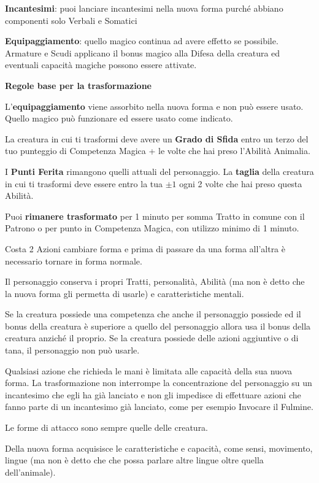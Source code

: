 \begin{multicols}{2}
\textbf{Incantesimi}: puoi lanciare incantesimi nella nuova forma purché abbiano componenti solo Verbali e Somatici

\textbf{Equipaggiamento}: quello magico continua ad avere effetto se possibile. Armature e Scudi applicano il bonus magico alla Difesa della creatura ed eventuali capacità magiche possono essere attivate.

\medskip

\textbf{Regole base per la trasformazione}

\medskip

L'\textbf{equipaggiamento} viene assorbito nella nuova forma e non può essere usato. Quello magico può funzionare ed essere usato come indicato.

La creatura in cui ti trasformi deve avere un \textbf{Grado di Sfida} entro un terzo del tuo punteggio di Competenza Magica + le volte che hai preso l'Abilità Animalia.

I \textbf{Punti Ferita} rimangono quelli attuali del personaggio. La \textbf{taglia} della creatura in cui ti trasformi deve essere entro la tua $\pm 1$ ogni 2 volte che hai preso questa Abilità.

Puoi \textbf{rimanere trasformato} per 1 minuto per somma Tratto in comune con il Patrono  o per punto in Competenza Magica, con utilizzo minimo di 1 minuto.

Costa 2 Azioni cambiare forma e prima di passare da una forma all'altra è necessario tornare in forma normale.

Il personaggio conserva i propri Tratti, personalità, Abilità (ma non è detto che la nuova forma gli permetta di usarle) e caratteristiche mentali.

Se la creatura possiede una competenza che anche il personaggio possiede ed il bonus della creatura è superiore a quello del personaggio allora usa il bonus della creatura anziché il proprio. Se la creatura possiede delle azioni aggiuntive o di tana, il personaggio non può usarle.

Qualsiasi azione che richieda le mani è limitata alle capacità della sua nuova forma. La trasformazione non interrompe la concentrazione del personaggio su un incantesimo che egli ha già lanciato e non gli impedisce di effettuare azioni che fanno parte di un incantesimo già lanciato, come per esempio Invocare il Fulmine.

Le forme di attacco sono sempre quelle delle creatura.

Della nuova forma acquisisce le caratteristiche e capacità, come sensi, movimento, lingue (ma non è detto che che possa parlare altre lingue oltre quella dell'animale).


\end{multicols}
